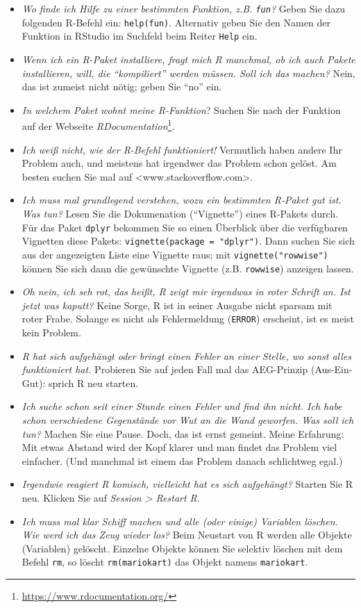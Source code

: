 \documentclass[
  letterpaper,
  oneside,
  open=any]{scrbook}
\providecommand{\tightlist}{%
  \setlength{\itemsep}{0pt}\setlength{\parskip}{0pt}}\usepackage{longtable,booktabs,array}
\theoremstyle{definition}
\theoremstyle{definition}
\theoremstyle{definition}
\theoremstyle{remark}
\begin{document}
\begin{itemize}
\tightlist
\item
  \emph{Wo finde ich Hilfe zu einer bestimmten Funktion, z.B.
  \texttt{fun}?} Geben Sie dazu folgenden R-Befehl ein:
  \texttt{help(fun)}. Alternativ geben Sie den Namen der Funktion in
  RStudio im Suchfeld beim Reiter \texttt{Help} ein.
\item
  \emph{Wenn ich ein R-Paket installiere, fragt mich R manchmal, ob ich
  auch Pakete installieren, will, die \enquote{kompiliert} werden
  müssen. Soll ich das machen?} Nein, das ist zumeist nicht nötig; geben
  Sie \enquote{no} ein.
\item
  \emph{In welchem Paket wohnt meine R-Funktion}? Suchen Sie nach der
  Funktion auf der Webseite \emph{RDocumentation}\footnote{\url{https://www.rdocumentation.org/}}.
\item
  \emph{Ich weiß nicht, wie der R-Befehl funktioniert!} Vermutlich haben
  andere Ihr Problem auch, und meistens hat irgendwer das Problem schon
  gelöst. Am besten suchen Sie mal auf
  \textless www.stackoverflow.com\textgreater.
\item
  \emph{Ich muss mal grundlegend verstehen, wozu ein bestimmten R-Paket
  gut ist. Was tun?} Lesen Sie die Dokumenation (\enquote{Vignette})
  eines R-Pakets durch. Für das Paket \texttt{dplyr} bekommen Sie so
  einen Überblick über die verfügbaren Vignetten diese Pakets:
  \texttt{vignette(package\ =\ "dplyr")}. Dann suchen Sie sich aus der
  angezeigten Liste eine Vignette raus; mit \texttt{vignette("rowwise")}
  können Sie sich dann die gewünschte Vignette (z.B. \texttt{rowwise})
  anzeigen lassen.
\item
  \emph{Oh nein, ich seh rot, das heißt, R zeigt mir irgendwas in roter
  Schrift an. Ist jetzt was kaputt?} Keine Sorge, R ist in seiner
  Ausgabe nicht sparsam mit roter Frabe. Solange es nicht als
  Fehlermeldung (\texttt{ERROR}) erscheint, ist es meist kein Problem.
\item
  \emph{R hat sich aufgehängt oder bringt einen Fehler an einer Stelle,
  wo sonst alles funktioniert hat.} Probieren Sie auf jeden Fall mal das
  AEG-Prinzip (Aus-Ein-Gut): sprich R neu starten.
\item
  \emph{Ich suche schon seit einer Stunde einen Fehler und find ihn
  nicht. Ich habe schon verschiedene Gegenstände vor Wut an die Wand
  geworfen. Was soll ich tun?} Machen Sie eine Pause. Doch, das ist
  ernst gemeint. Meine Erfahrung: Mit etwas Abstand wird der Kopf klarer
  und man findet das Problem viel einfacher. (Und manchmal ist einem das
  Problem danach schlichtweg egal.)
\item
  \emph{Irgendwie reagiert R komisch, vielleicht hat es sich
  aufgehängt?} Starten Sie R neu. Klicken Sie auf \emph{Session
  \textgreater{} Restart R}.
\item
  \emph{Ich muss mal klar Schiff machen und alle (oder einige) Variablen
  löschen. Wie werd ich das Zeug wieder los?} Beim Neustart von R werden
  alle Objekte (Variablen) gelöscht. Einzelne Objekte können Sie
  selektiv löschen mit dem Befehl \texttt{rm}, so löscht
  \texttt{rm(mariokart)} das Objekt namens \texttt{mariokart}.
\end{itemize}
\end{document}
